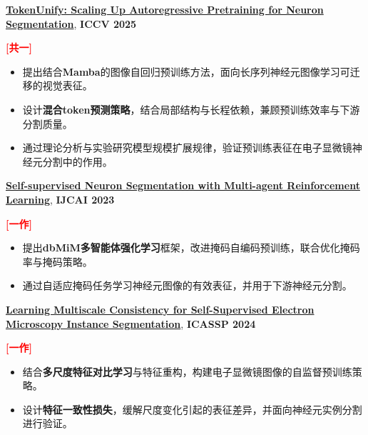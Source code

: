 \documentclass{resume}
\begin{document}
\begin{enumerate}[label=\textbf{[\arabic*]}, leftmargin=2em, itemsep=3pt]
    \item \kaishu \parbox[t]{0.88\linewidth}{\textbf{\href{https://openaccess.thecvf.com/content/ICCV2025/html/Chen_TokenUnify_Scaling_Up_Autoregressive_Pretraining_for_Neuron_Segmentation_ICCV_2025_paper.html}{TokenUnify: Scaling Up Autoregressive Pretraining for Neuron Segmentation}}, \textbf{ICCV 2025}} \hfill \textcolor{red}{\textbf{[共一]}}
    \begin{itemize}
        \item 提出结合\textbf{Mamba}的图像自回归预训练方法，面向长序列神经元图像学习可迁移的视觉表征。
        \item 设计\textbf{混合token预测策略}，结合局部结构与长程依赖，兼顾预训练效率与下游分割质量。
        \item 通过理论分析与实验研究模型规模扩展规律，验证预训练表征在电子显微镜神经元分割中的作用。
    \end{itemize}

    \item \kaishu \parbox[t]{0.88\linewidth}{\textbf{\href{https://www.ijcai.org/proceedings/2023/0068.pdf}{Self-supervised Neuron Segmentation with Multi-agent Reinforcement Learning}}, \textbf{IJCAI 2023}} \hfill \textcolor{red}{\textbf{[一作]}}
    \begin{itemize}
        \item 提出\textbf{dbMiM多智能体强化学习}框架，改进掩码自编码预训练，联合优化掩码率与掩码策略。
        \item 通过自适应掩码任务学习神经元图像的有效表征，并用于下游神经元分割。
    \end{itemize}

    \item \kaishu \parbox[t]{0.88\linewidth}{\textbf{\href{https://arxiv.org/abs/2308.09917}{Learning Multiscale Consistency for Self-Supervised Electron Microscopy Instance Segmentation}}, \textbf{ICASSP 2024}} \hfill \textcolor{red}{\textbf{[一作]}}
    \begin{itemize}
        \item 结合\textbf{多尺度特征对比学习}与特征重构，构建电子显微镜图像的自监督预训练策略。
        \item 设计\textbf{特征一致性损失}，缓解尺度变化引起的表征差异，并面向神经元实例分割进行验证。
    \end{itemize}

\end{enumerate}
\end{document}
